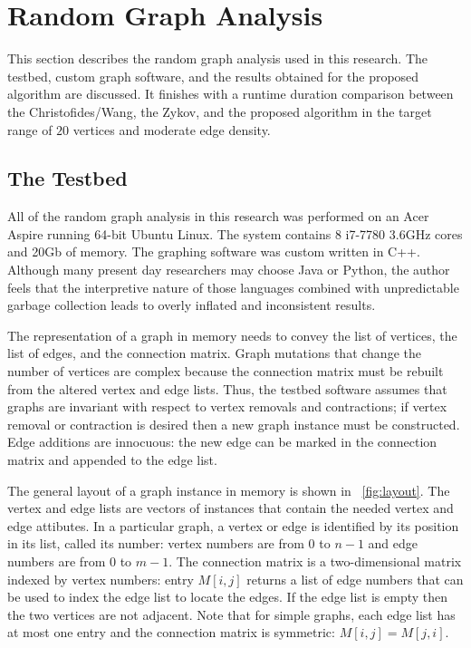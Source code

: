 \section{Random Graph Analysis}\label{sec:random}

This section describes the random graph analysis used in this research.  The testbed, custom graph software, and
the results obtained for the proposed algorithm are discussed.  It finishes with a runtime duration comparison
between the Christofides/Wang, the Zykov, and the proposed algorithm in the target range of \(20\) vertices and
moderate edge density.

\subsection{The Testbed}\label{sec:sub:testbed}

All of the random graph analysis in this research was performed on an Acer Aspire running 64-bit Ubuntu Linux.  The
system contains 8 i7-7780 3.6GHz cores and 20Gb of memory.  The graphing software was custom written in C++.
Although many present day researchers may choose Java or Python, the author feels that the interpretive nature of
those languages combined with unpredictable garbage collection leads to overly inflated and inconsistent results.

The representation of a graph in memory needs to convey the list of vertices, the list of edges, and the connection
matrix.  Graph mutations that change the number of vertices are complex because the connection matrix must be
rebuilt from the altered vertex and edge lists.  Thus, the testbed software assumes that graphs are invariant with
respect to vertex removals and contractions; if vertex removal or contraction is desired then a new graph instance
must be constructed.  Edge additions are innocuous: the new edge can be marked in the connection matrix and
appended to the edge list.

The general layout of a graph instance in memory is shown in \figurename~\ref{fig:layout}.  The vertex and edge
lists are vectors of instances that contain the needed vertex and edge attibutes.  In a particular graph, a vertex
or edge is identified by its position in its list, called its number: vertex numbers are from \(0\) to \(n-1\) and
edge numbers are from \(0\) to \(m-1\).  The connection matrix is a two-dimensional matrix indexed by vertex
numbers: entry \(M[i,j]\) returns a list of edge numbers that can be used to index the edge list to locate the
edges.  If the edge list is empty then the two vertices are not adjacent.  Note that for simple graphs, each edge
list has at most one entry and the connection matrix is symmetric: \(M[i,j]=M[j,i]\).

